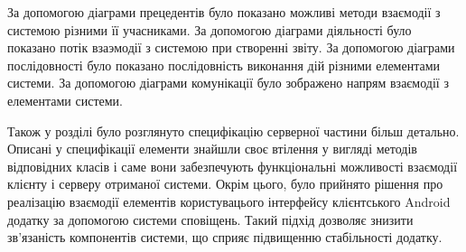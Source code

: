 \documentclass[../main.tex]{subfiles}
\begin{document}
	За допомогою діаграми прецедентів було показано можливі методи взаємодії з системою різними її учасниками. За допомогою діаграми діяльності було показано потік взаэмодії з системою при створенні звіту. За допомогою діаграми послідовності було показано послідовність виконання дій різними елементами системи. За допомогою діаграми комунікації було зображено напрям взаємодії з елементами системи.
	
	Також у розділі було розглянуто специфікацію серверної частини більш детально. Описані у специфікації елементи знайшли своє втілення у вигляді методів відповідних класів і саме вони забезпечують функціональні можливості взаємодії клієнту і серверу отриманої системи. Окрім цього, було прийнято рішення про реалізацію взаємодії елементів користувацього інтерфейсу клієнтського Android додатку за допомогою системи сповіщень. Такий підхід дозволяє знизити зв'язаність компонентів системи, що сприяє підвищенню стабільності додатку.
\end{document}

